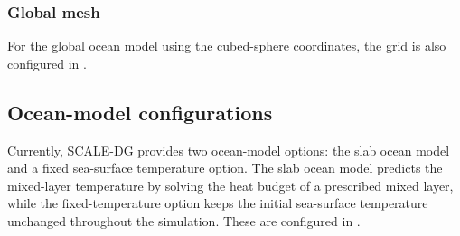 \subsubsection{Global mesh}

For the global ocean model using the cubed-sphere coordinates,
the grid is also configured in .


\subsection{Ocean-model configurations}
\label{subsec:ocean_model_config}

Currently, SCALE-DG provides two ocean-model options: the slab ocean model and a fixed sea-surface temperature option.
The slab ocean model predicts the mixed-layer temperature by solving the heat budget of a prescribed mixed layer, 
while the fixed-temperature option keeps the initial sea-surface temperature unchanged throughout the simulation.
These are configured in .

